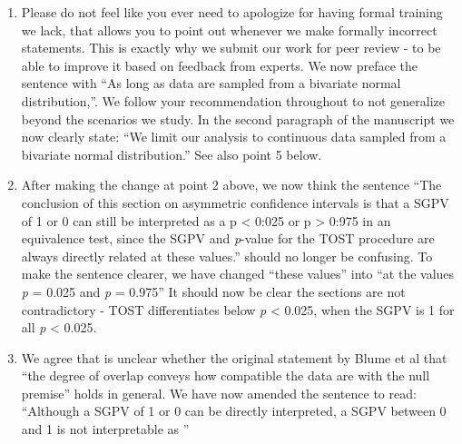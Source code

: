 \documentclass[man]{apa6}
\begin{document}
\begin{enumerate}
{  observed results, while the SGPV does not differentiate} and
  \enquote{Where the SGPV is 1 as long as the confidence interval falls
  completely within the equivalence bounds, the \emph{p}-value for the
  TOST continues to differentiate between results as a function of how
  far the confidence interval lies within the equivalence bounds} and
  similarly \enquote{A third situation in which the SGPV remains stable
  across a range of observed effects, while the TOST \emph{p}-value
  continues to differentiate, is whenever the CI is wider than the
  equivalence range, and the CI overlaps with the upper \emph{and} lower
  equivalence bound}. We have removed the word \enquote{unrelated}
  throughout the manuscript.
\item
  Please do not feel like you ever need to apologize for having formal
  training we lack, that allows you to point out whenever we make
  formally incorrect statements. This is exactly why we submit our work
  for peer review - to be able to improve it based on feedback from
  experts. We now preface the sentence with \enquote{As long as data are
  sampled from a bivariate normal distribution,}. We follow your
  recommendation throughout to not generalize beyond the scenarios we
  study. In the second paragraph of the manuscript we now clearly state:
  \enquote{We limit our analysis to continuous data sampled from a
  bivariate normal distribution.} See also point 5 below.
\item
  After making the change at point 2 above, we now think the sentence
  \enquote{The conclusion of this section on asymmetric confidence
  intervals is that a SGPV of 1 or 0 can still be interpreted as a p
  \textless{} 0:025 or p \textgreater{} 0:975 in an equivalence test,
  since the SGPV and \emph{p}-value for the TOST procedure are always
  directly related at these values.} should no longer be confusing. To
  make the sentence clearer, we have changed \enquote{these values} into
  \enquote{at the values \emph{p} = 0.025 and \emph{p} = 0.975} It
  should now be clear the sections are not contradictory - TOST
  differentiates below \emph{p} \textless{} 0.025, when the SGPV is 1
  for all \emph{p} \textless{} 0.025.
\item
  We agree that is unclear whether the original statement by Blume et al
  that \enquote{the degree of overlap conveys how compatible the data
  are with the null premise} holds in general. We have now amended the
  sentence to read: \enquote{Although a SGPV of 1 or 0 can be directly
  interpreted, a SGPV between 0 and 1 is not interpretable as
}
\end{enumerate}
\end{document}

